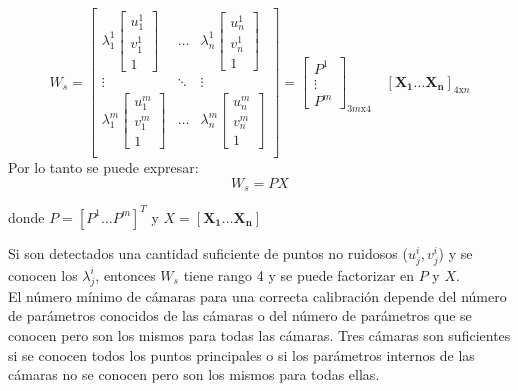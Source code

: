 \[
W_s =
\begin{bmatrix}

	\lambda_1^1
	\begin{bmatrix}
	u_1^1 \\
	v_1^1 \\
	1
	\end{bmatrix} &
	
	\ldots &
	
	\lambda_n^1
	\begin{bmatrix}
	u_n^1 \\
	v_n^1 \\
	1
	\end{bmatrix} \\
	
	\vdots & \ddots & \vdots \\
	
	
	\lambda_1^m
	\begin{bmatrix}
	u_1^m \\
	v_1^m \\
	1
	\end{bmatrix} &
	
	\ldots &
	
	\lambda_n^m
	\begin{bmatrix}
	u_n^m \\
	v_n^m \\
	1
	\end{bmatrix} \\

\end{bmatrix}
= 
\begin{bmatrix}
P^1 \\
\vdots \\
P^m
\end{bmatrix}_{3m\text{x}4}
\quad
[\mathbf{X_1} \ldots \mathbf{X_n}]_{4\text{x}n}
\]
Por lo tanto se puede expresar:
\[ W_s = PX\]

donde $P = [P^1 \ldots P^m]^T$ y $X = [\mathbf{X_1} \ldots \mathbf{X_n}]$

Si son detectados una cantidad suficiente de puntos no ruidosos ($u_j^i, v_j^i$) y se conocen los $\lambda_j^i$, entonces $W_s$ tiene rango 4  y se puede factorizar en $P$ y $X$.\\

El número mínimo de cámaras para una correcta calibración depende del número de parámetros conocidos de las cámaras o del número de parámetros que se conocen pero son los mismos para todas las cámaras. Tres cámaras son suficientes si se conocen todos los puntos principales o si los parámetros internos de las cámaras no se conocen pero son los mismos para todas ellas.\\

